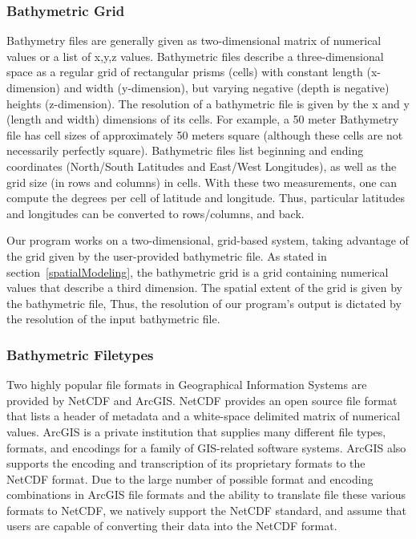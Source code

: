 \subsubsection{Bathymetric Grid}
\label{bathymetricGrid}
Bathymetry files are generally given as two-dimensional matrix of numerical values or a list of x,y,z values.  Bathymetric files describe a three-dimensional space as a regular grid of rectangular prisms (cells) with constant length (x-dimension) and width (y-dimension), but varying negative (depth is negative)  heights (z-dimension).  The resolution of a bathymetric file is given by the x and y (length and width) dimensions of its cells.  For example, a 50 meter Bathymetry file has cell sizes of approximately 50 meters square (although these cells are not necessarily perfectly square).  Bathymetric files list beginning and ending coordinates (North/South Latitudes and East/West Longitudes), as well as the grid size (in rows and columns) in cells.  With these two measurements, one can compute the degrees per cell of latitude and longitude.  Thus, particular latitudes and longitudes can be converted to rows/columns, and back.  

Our program works on a two-dimensional, grid-based system, taking advantage of the grid given by the user-provided bathymetric file.  As stated in section~\ref{spatialModeling}, the bathymetric grid is a grid containing numerical values that describe a third dimension.  The spatial extent of the grid is given by the bathymetric file, Thus, the resolution of our program's output is dictated by the resolution of the input bathymetric file. 

\subsubsection{Bathymetric Filetypes}
Two highly popular file formats in Geographical Information Systems are provided by NetCDF and ArcGIS.  NetCDF provides an open source file format that lists a header of metadata and a white-space delimited matrix of numerical values.  ArcGIS is a private institution that supplies many different file types, formats, and encodings for a family of GIS-related software systems.  ArcGIS also supports the encoding and transcription of its proprietary formats to the NetCDF format.  Due to the large number of possible format and encoding combinations in ArcGIS file formats and the ability to translate file these various formats to NetCDF, we natively support the NetCDF standard, and assume that users are capable of converting their data into the NetCDF format.  


